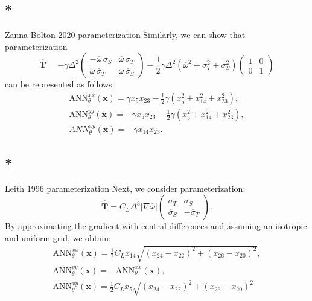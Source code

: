 \documentclass[draft,grl]{agutexSI2019}
\begin{document}
\begin{article}
\subsection{*}{Zanna-Bolton 2020 parameterization}
Similarly, we can show that  parameterization
\begin{equation}
    \widehat{\mathbf{T}} = - \gamma \Delta^2 
    \begin{pmatrix}
        -\overline{\omega} \, \overline{\sigma}_S & \overline{\omega} \, \overline{\sigma}_T\\
        \overline{\omega} \, \overline{\sigma}_T & \overline{\omega} \, \overline{\sigma}_S
    \end{pmatrix} - \frac{1}{2}\gamma \Delta^2 (
        \overline{\omega}^2 + \overline{\sigma}_T^2 + \overline{\sigma}_S^2)
    \begin{pmatrix}
        1 & 0\\
        0 & 1
    \end{pmatrix}
\end{equation}
can be represented as follows:
\begin{gather}
    \mathrm{ANN}_{\theta}^{xx}(\mathbf{x}) =  \gamma x_5 x_{23} - \frac{1}{2} \gamma (x_5^2 + x_{14}^2 + x_{23}^2), \\
    \mathrm{ANN}_{\theta}^{yy}(\mathbf{x}) =  -\gamma x_5 x_{23} - \frac{1}{2} \gamma (x_5^2 + x_{14}^2 + x_{23}^2), \\
    ANN_{\theta}^{xy}(\mathbf{x}) =  -\gamma x_{14} x_{23}. 
\end{gather}

\subsection{*}{Leith 1996 parameterization} Next, we consider  parameterization:
\begin{equation}
    \widehat{\mathbf{T}} = C_L \Delta^3 | \nabla \overline{\omega}| \begin{pmatrix}
    \overline{\sigma}_T & \overline{\sigma}_S \\
    \overline{\sigma}_S & -\overline{\sigma}_T
    \end{pmatrix}.
\end{equation}
By approximating the gradient with central differences and assuming an isotropic and uniform grid, we obtain:
\begin{gather}
    \mathrm{ANN}_{\theta}^{xx}(\mathbf{x}) = \frac{1}{2} C_L x_{14} \sqrt{(x_{24}-x_{22})^2 + (x_{26}-x_{20})^2}, \\
    \mathrm{ANN}_{\theta}^{yy}(\mathbf{x}) = -\mathrm{ANN}_{\theta}^{xx}(\mathbf{x}), \\
    \mathrm{ANN}_{\theta}^{xy}(\mathbf{x}) = \frac{1}{2} C_L x_{5} \sqrt{(x_{24}-x_{22})^2 + (x_{26}-x_{20})^2}
\end{gather}


\end{article}
\end{document}
